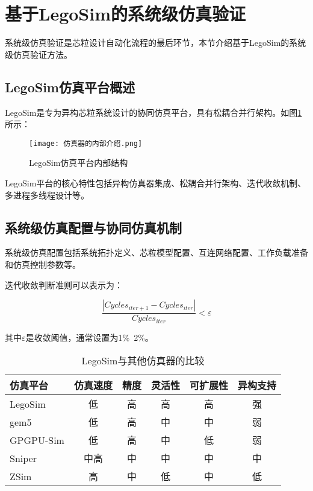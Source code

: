 \documentclass[bachelor]{thesis-uestc}
\begin{document}
\section{基于LegoSim的系统级仿真验证}

系统级仿真验证是芯粒设计自动化流程的最后环节，本节介绍基于LegoSim的系统级仿真验证方法。

\subsection{LegoSim仿真平台概述}

LegoSim是专为异构芯粒系统设计的协同仿真平台，具有松耦合并行架构。如图\ref{fig:legosim_internal}所示：

\begin{figure}[htbp]
    \centering
    \texttt{[image: 仿真器的内部介绍.png]}
    \caption{LegoSim仿真平台内部结构}
    \label{fig:legosim_internal}
\end{figure}

LegoSim平台的核心特性包括异构仿真器集成、松耦合并行架构、迭代收敛机制、多进程多线程设计等。

\subsection{系统级仿真配置与协同仿真机制}

系统级仿真配置包括系统拓扑定义、芯粒模型配置、互连网络配置、工作负载准备和仿真控制参数等。

迭代收敛判断准则可以表示为：

\begin{equation}
\frac{|Cycles_{iter+1} - Cycles_{iter}|}{Cycles_{iter}} < \varepsilon
\end{equation}

其中$\varepsilon$是收敛阈值，通常设置为1\%~2\%。

\begin{table}[htbp]
\caption{LegoSim与其他仿真器的比较}
\centering
\begin{tabular}{|l|c|c|c|c|c|}
\hline
\textbf{仿真平台} & \textbf{仿真速度} & \textbf{精度} & \textbf{灵活性} & \textbf{可扩展性} & \textbf{异构支持} \\
\hline
LegoSim & 低 & 高 & 高 & 高 & 强 \\
\hline
gem5 & 低 & 高 & 中 & 中 & 弱 \\
\hline
GPGPU-Sim & 低 & 高 & 中 & 低 & 弱 \\
\hline
Sniper & 中高 & 中 & 中 & 中 & 中 \\
\hline
ZSim & 高 & 中 & 低 & 中 & 低 \\
\hline
\end{tabular}
\label{tab:sim_comparison}
\end{table}
\end{document}

